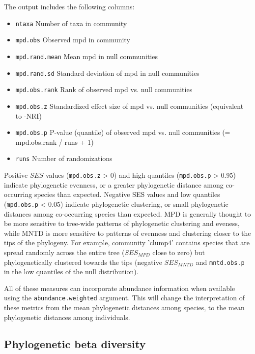 \documentclass[12pt]{article}
\begin{document}
\noindent The output includes the following columns:

\begin{itemize}
\item{ \texttt{ntaxa}}	 Number of taxa in community
\item{ \texttt{mpd.obs}}	 Observed mpd in community
\item{ \texttt{mpd.rand.mean}}	 Mean mpd in null communities
\item{ \texttt{mpd.rand.sd}}	 Standard deviation of mpd in null communities
\item{ \texttt{mpd.obs.rank}}	 Rank of observed mpd vs. null communities
\item{ \texttt{mpd.obs.z}}	 Standardized effect size of mpd vs. null communities (equivalent to -NRI)
\item{ \texttt{mpd.obs.p}}	 P-value (quantile) of observed mpd vs. null communities (= mpd.obs.rank / runs + 1)
\item{ \texttt{runs}}	 Number of randomizations
\end{itemize}

Positive $SES$ values (\texttt{mpd.obs.z} > 0) and high quantiles (\texttt{mpd.obs.p} > 0.95) indicate phylogenetic evenness, or a greater phylogenetic distance among co-occurring species than expected. Negative SES values and low quantiles (\texttt{mpd.obs.p} < 0.05) indicate phylogenetic clustering, or small phylogenetic distances among co-occurring species than expected. MPD is generally thought to be more sensitive to tree-wide patterns of phylogenetic clustering and eveness, while MNTD is more sensitive to patterns of evenness and clustering closer to the tips of the phylogeny. For example, community 'clump4' contains species that are spread randomly across the entire tree ($SES_{MPD}$ close to zero) but phylogenetically clustered towards the tips (negative $SES_{MNTD}$ and \texttt{mntd.obs.p} in the low quantiles of the null distribution).

All of these measures can incorporate abundance information when available using the \texttt{abundance.weighted} argument. This will change the interpretation of these metrics from the mean phylogenetic distances among species, to the mean phylogenetic distances among individuals.

\subsection{Phylogenetic beta diversity}
\end{document}
